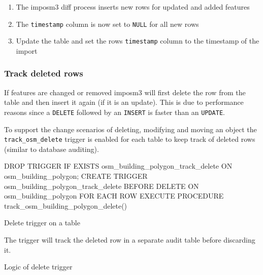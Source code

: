 \begin{enumerate}
   \item The imposm3 diff process inserts new rows for updated and added features
   \item The \texttt{timestamp} column is now set to \texttt{NULL} for all new rows
   \item Update the table and set the rows \texttt{timestamp} column to the timestamp of the import
\end{enumerate}

\subsubsection{Track deleted rows}

If \osm{} features are changed or removed imposm3 will first delete the row from the table and then insert it again (if it is an update). This is due to performance reasons since a \texttt{DELETE} followed by an \texttt{INSERT} is faster than an \texttt{UPDATE}.

To support the change scenarios of deleting, modifying and moving an object the \texttt{track\_osm\_delete} trigger is enabled for each table to keep track of deleted rows (similar to database auditing).

\begin{listing}[H]
  \centering
  \begin{sqlcode}
    DROP TRIGGER IF EXISTS osm_building_polygon_track_delete ON osm_building_polygon;
    CREATE TRIGGER osm_building_polygon_track_delete
    BEFORE DELETE ON osm_building_polygon
    FOR EACH ROW EXECUTE PROCEDURE track_osm_building_polygon_delete()
  \end{sqlcode}
  \caption{Delete trigger on a table}
\end{listing}

The trigger will track the deleted row in a separate audit table before discarding it.

\begin{listing}[H]
  \centering
  \caption{Logic of delete trigger}
\end{listing}

